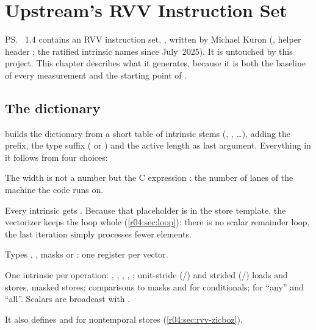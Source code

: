 \chapter{Upstream's RVV Instruction Set}\label{r04:ch:upstream-rvv}

\ps{}~1.4 contains an RVV instruction set, , written by Michael Kuron
(, helper header
; the ratified  intrinsic names since
July~2025). It is untouched by this project. This chapter describes what it generates,
because it is both the baseline of every measurement and the starting point of
.

\section{The dictionary}

 builds the dictionary from a
short table of intrinsic stems (, , \dots), adding the  prefix, the type suffix
( or ) and the active length as last argument. Everything in
it follows from four choices:
\begin{description}[style=nextline]
  \item[Vector-length agnostic] The width is not a number but the C expression
    : the number of lanes of the machine the code runs on.
  \item[Active length ``elements left''] Every intrinsic gets
    . Because that placeholder is in the store
    template, the vectorizer keeps the loop whole (\cref{r04:sec:loop}): there is no
    scalar remainder loop, the last iteration simply processes fewer elements.
  \item[LMUL~1] Types , , masks 
    or : one register per vector.
  \item[Plain intrinsics] One intrinsic per operation: , ,
    , , ; unit-stride (/)
    and strided (/) loads and stores, masked stores; comparisons to
    masks and  for conditionals;  for ``any'' and ``all''.
    Scalars are broadcast with .
\end{description}
It also defines  and  for nontemporal stores
(\cref{r04:sec:rvv-zicboz}).

